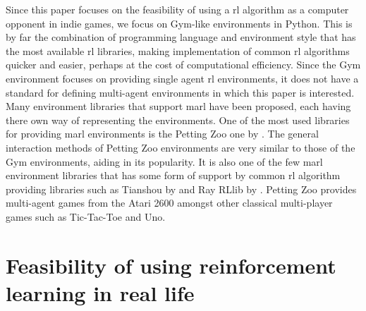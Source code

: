 Since this paper focuses on the feasibility of using a \gls{rl} algorithm as a computer opponent in indie games, we focus on Gym-like environments in Python.
This is by far the combination of programming language and environment style that has the most available \gls{rl} libraries, making implementation of common \gls{rl} algorithms quicker and easier, perhaps at the cost of computational efficiency.
Since the Gym environment focuses on providing single agent \gls{rl} environments, it does not have a standard for defining multi-agent environments in which this paper is interested.
Many environment libraries that support \gls{marl} have been proposed, each having there own way of representing the environments.
One of the most used libraries for providing \gls{marl} environments is the Petting Zoo one by \citet{pettingzoo}.
The general interaction methods of Petting Zoo environments are very similar to those of the Gym environments, aiding in its popularity.
It is also one of the few \gls{marl} environment libraries that has some form of support by common \gls{rl} algorithm providing libraries such as Tianshou by \citet{tianshou} and Ray RLlib by \citet{rllib}.
Petting Zoo provides multi-agent games from the Atari 2600 amongst other classical multi-player games such as Tic-Tac-Toe and Uno.





\section{Feasibility of using reinforcement learning in real life}
\label{sec:intro-irl}

